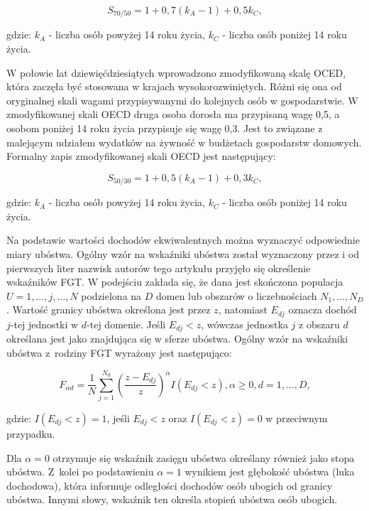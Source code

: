 \begin{equation}
S_{70/50}=1+0,7(k_A-1)+0,5k_C,
\end{equation}

gdzie: $k_A$ - liczba osób powyżej 14 roku życia, $k_C$ - liczba osób poniżej 14 roku życia.

W połowie lat dziewięćdziesiątych wprowadzono zmodyfikowaną skalę OCED, która zaczęła być stosowana w krajach wysokorozwiniętych. Różni się ona od oryginalnej skali wagami przypisywanymi do kolejnych osób w gospodarstwie. W zmodyfikowanej skali OECD druga osoba dorosła ma przypisaną wagę 0,5, a osobom poniżej 14 roku życia przypisuje się wagę 0,3. Jest to związane z malejącym udziałem wydatków na żywność w budżetach gospodarstw domowych. Formalny zapis zmodyfikowanej skali OECD jest następujący:

\begin{equation}
S_{50/30}=1+0,5(k_A-1)+0,3k_C,
\end{equation}

gdzie: $k_A$ - liczba osób powyżej 14 roku życia, $k_C$ - liczba osób poniżej 14 roku życia.

Na podstawie wartości dochodów ekwiwalentnych można wyznaczyć odpowiednie miary ubóstwa. Ogólny wzór na wskaźniki ubóstwa został wyznaczony przez \citep{fgt1984} i od pierwszych liter nazwisk autorów tego artykułu przyjęło się określenie wskaźników FGT. W podejściu zakłada się, że dana jest skończona populacja $U={1,..., j, ..., N}$ podzielona na $D$ domen lub obszarów o liczebnościach $N_1, ..., N_D$. Wartość granicy ubóstwa określona jest przez $z$, natomiast $E_{dj}$ oznacza dochód $j$-tej jednostki w $d$-tej domenie. Jeśli $E_{dj} < z$, wówczas jednostka $j$ z obszaru $d$ określana jest jako znajdująca się w sferze ubóstwa. Ogólny wzór na wskaźniki ubóstwa z~rodziny FGT wyrażony jest następująco:

\begin{equation}
\label{eq:fgt}
F_{\alpha d}=\frac{1}{N}\sum\limits_{j=1}^{N_d}{\left(\frac{z-E_{dj}}{z}\right)^\alpha}I(E_{dj}<z), \alpha \geq 0, d=1, ..., D,
\end{equation}

gdzie: $I(E_{dj}<z) = 1$, jeśli $E_{dj}<z$ oraz $I(E_{dj}<z) = 0$ w przeciwnym przypadku.

Dla $\alpha=0$ otrzymuje się wskaźnik zasięgu ubóstwa określany również jako stopa ubóstwa. Z~kolei po podstawieniu $\alpha=1$ wynikiem jest głębokość ubóstwa (luka dochodowa), która informuje odległości dochodów osób ubogich od granicy ubóstwa. Innymi słowy, wskaźnik ten określa stopień ubóstwa osób ubogich.

